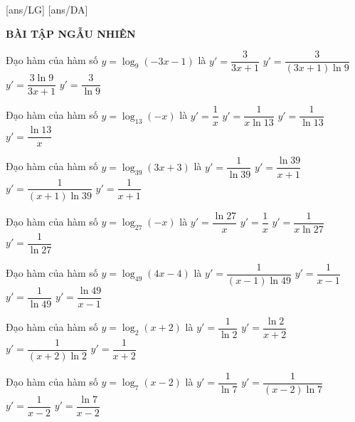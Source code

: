 \documentclass[12pt,a4paper]{article}
\begin{document}
[ans/LG]
[ans/DA]
\pagestyle{fancy}
\fancyhf{}
\begin{center}
{\bf\Large BÀI TẬP NGẪU NHIÊN}
\end{center}
\begin{ex}
Đạo hàm của hàm số $y=\log_9(-3x-1)$ là
\choice
{$y'=\dfrac{3}{3x+1}$}
{\True $y'=\dfrac{3}{(3x+1)\ln 9}$}
{$y'=\dfrac{3\ln{9}}{3x+1}$}
{$y'=\dfrac{3}{\ln{9}}$}
\end{ex}
\begin{ex}
Đạo hàm của hàm số $y=\log_{13}(-x)$ là
\choice
{$y'=\dfrac{1}{x}$}
{\True $y'=\dfrac{1}{x\ln 13}$}
{$y'=\dfrac{1}{\ln{13}}$}
{$y'=\dfrac{\ln{13}}{x}$}
\end{ex}
\begin{ex}
Đạo hàm của hàm số $y=\log_{39}(3x+3)$ là
\choice
{$y'=\dfrac{1}{\ln{39}}$}
{$y'=\dfrac{\ln{39}}{x+1}$}
{\True $y'=\dfrac{1}{(x+1)\ln 39}$}
{$y'=\dfrac{1}{x+1}$}
\end{ex}
\begin{ex}
Đạo hàm của hàm số $y=\log_{27}(-x)$ là
\choice
{$y'=\dfrac{\ln{27}}{x}$}
{$y'=\dfrac{1}{x}$}
{\True $y'=\dfrac{1}{x\ln 27}$}
{$y'=\dfrac{1}{\ln{27}}$}
\end{ex}
\begin{ex}
Đạo hàm của hàm số $y=\log_{49}(4x-4)$ là
\choice
{\True $y'=\dfrac{1}{(x-1)\ln 49}$}
{$y'=\dfrac{1}{x-1}$}
{$y'=\dfrac{1}{\ln{49}}$}
{$y'=\dfrac{\ln{49}}{x-1}$}
\end{ex}
\begin{ex}
Đạo hàm của hàm số $y=\log_2(x+2)$ là
\choice
{$y'=\dfrac{1}{\ln{2}}$}
{$y'=\dfrac{\ln{2}}{x+2}$}
{\True $y'=\dfrac{1}{(x+2)\ln 2}$}
{$y'=\dfrac{1}{x+2}$}
\end{ex}
\begin{ex}
Đạo hàm của hàm số $y=\log_7(x-2)$ là
\choice
{$y'=\dfrac{1}{\ln{7}}$}
{\True $y'=\dfrac{1}{(x-2)\ln 7}$}
{$y'=\dfrac{1}{x-2}$}
{$y'=\dfrac{\ln{7}}{x-2}$}
\end{ex}
\end{document}
